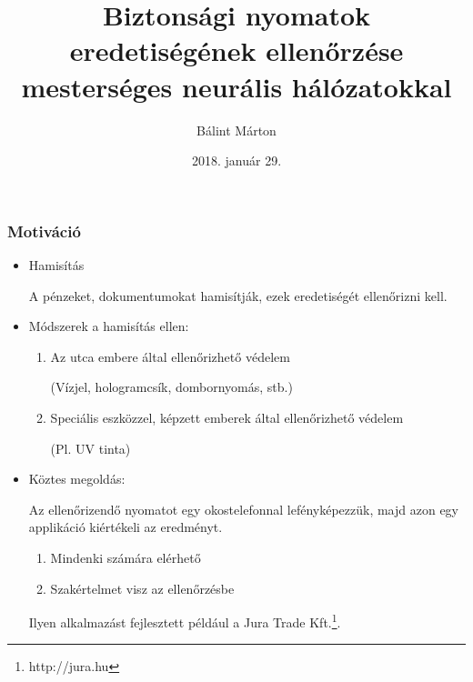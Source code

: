 \documentclass[11pt]{beamer}
\author{Bálint Márton}
\title[Diplomamunka]{Biztonsági nyomatok eredetiségének ellenőrzése mesterséges neurális hálózatokkal}
\institute[ELTE]{Eötvös Loránd Tudományegyetem}
\date{2018. január 29.}
\begin{document}
	
\begin{frame}[plain]
	\maketitle
\end{frame}

\begin{frame}
	\frametitle{Motiváció}
	
	\begin{itemize}
	\item 
		Hamisítás
		
		A pénzeket, dokumentumokat hamisítják, ezek eredetiségét ellenőrizni kell.
		
	\item 
		Módszerek a hamisítás ellen:
	
		\begin{enumerate}
			\item
			Az utca embere által ellenőrizhető védelem
			
			(Vízjel, hologramcsík, dombornyomás, stb.)
			
			\item
			Speciális eszközzel, képzett emberek által ellenőrizhető védelem
			
			(Pl. UV tinta)
		\end{enumerate}
		
	\item 
		Köztes megoldás:
		
		Az ellenőrizendő nyomatot egy okostelefonnal lefényképezzük, majd azon egy applikáció kiértékeli az eredményt. 
		
			\begin{enumerate}
			\item
			Mindenki számára elérhető
			
			\item
			Szakértelmet visz az ellenőrzésbe
			
		\end{enumerate}
		
		Ilyen alkalmazást fejlesztett például a Jura Trade Kft.\footnote{http://jura.hu}. 
		
		
	\end{itemize}

\end{frame}
\end{document}
